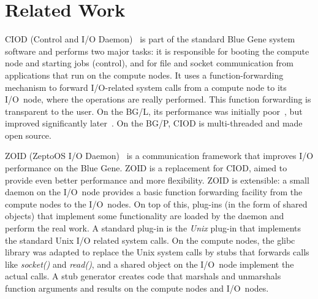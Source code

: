 \documentclass[journal]{IEEEtran}
\begin{document}


\section{Related Work}
\label{sec:related-work}

CIOD (Control and I/O Daemon)~\cite{IBM:08} is part of the standard Blue Gene
system software and performs two major tasks: it is responsible for booting
the compute node and starting jobs (control), and for file and socket
communication from applications that run on the compute nodes.
It uses a function-forwarding mechanism to forward I/O-related system calls
from a compute node to its I/O~node, where the operations are really performed.
This function forwarding is transparent to the user.
On the BG/L, its performance was initially poor~\cite{Romein:06}, but
improved significantly later~\cite{Iskra:08}.
On the BG/P, CIOD is multi-threaded and made open source.

ZOID (ZeptoOS I/O Daemon)~\cite{Iskra:08} is a communication framework that
improves I/O performance on the Blue Gene.
ZOID is a replacement for CIOD, aimed to provide even better performance and
more flexibility.
ZOID is extensible: a small daemon on the I/O~node provides a basic function
forwarding facility from the compute nodes to the I/O~nodes.
On top of this, plug-ins (in the form of shared objects) that implement some
functionality are loaded by the daemon and perform the real work.
A standard plug-in is the \emph{Unix\/} plug-in that implements the standard
Unix I/O related system calls.
On the compute nodes, the glibc library was adapted to replace the Unix
system calls by stubs that forwards calls like \emph{socket()\/} and
\emph{read()}, and a shared object on the I/O~node implement the actual calls.
A stub generator creates code that marshals and unmarshals function
arguments and results on the compute nodes and I/O~nodes.
\end{document}
